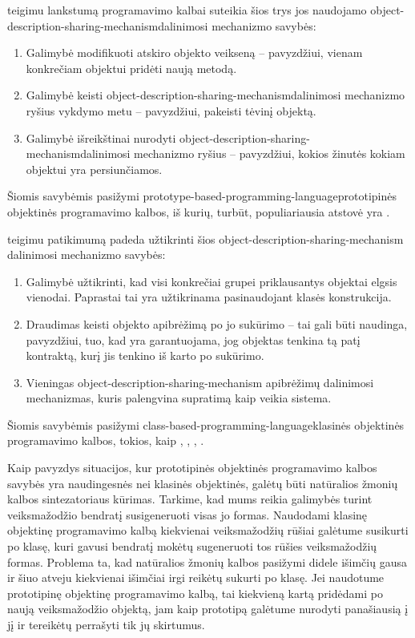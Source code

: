 \cite{Lieberman:1987:TO:62139.62144} teigimu lankstumą programavimo
kalbai suteikia šios trys jos naudojamo
\gls{object-description-sharing-mechanism}{dalinimosi mechanizmo}
savybės:
\begin{enumerate}
  \item Galimybė modifikuoti atskiro objekto veikseną – pavyzdžiui,
    vienam konkrečiam objektui pridėti naują metodą.
  \item Galimybė keisti
    \gls{object-description-sharing-mechanism}{dalinimosi
    mechanizmo} ryšius vykdymo metu – pavyzdžiui, pakeisti tėvinį
    objektą.
  \item Galimybė išreikštinai nurodyti
    \gls{object-description-sharing-mechanism}{dalinimosi mechanizmo}
    ryšius – pavyzdžiui, kokios žinutės kokiam objektui yra
    persiunčiamos.
\end{enumerate}
Šiomis savybėmis pasižymi
\gls{prototype-based-programming-language}{prototipinės objektinės
programavimo kalbos}, iš kurių, turbūt, populiariausia atstovė yra
.

\cite{Lieberman:1987:TO:62139.62144} teigimu patikimumą padeda
užtikrinti šios \gls{object-description-sharing-mechanism}{
dalinimosi mechanizmo} savybės:
\begin{enumerate}
  \item Galimybė užtikrinti, kad visi konkrečiai grupei priklausantys
    objektai elgsis vienodai. Paprastai tai yra užtikrinama
    pasinaudojant klasės konstrukcija.
  \item Draudimas keisti objekto apibrėžimą po jo sukūrimo – tai
    gali būti naudinga, pavyzdžiui, tuo, kad yra garantuojama,
    jog objektas tenkina tą patį kontraktą, kurį jis tenkino iš
    karto po sukūrimo.
  \item Vieningas \gls{object-description-sharing-mechanism}{
    apibrėžimų dalinimosi mechanizmas}, kuris palengvina supratimą
    kaip veikia sistema.
\end{enumerate}
Šiomis savybėmis pasižymi
\gls{class-based-programming-language}{klasinės objektinės
programavimo kalbos}, tokios, kaip , ,
, .

Kaip pavyzdys situacijos, kur prototipinės objektinės programavimo
kalbos savybės yra naudingesnės nei klasinės objektinės, galėtų
būti natūralios žmonių kalbos sintezatoriaus kūrimas. Tarkime, kad
mums reikia galimybės turint veiksmažodžio bendratį susigeneruoti
visas jo formas. Naudodami klasinę objektinę programavimo kalbą
kiekvienai veiksmažodžių rūšiai galėtume susikurti po klasę,
kuri gavusi bendratį mokėtų sugeneruoti tos rūšies veiksmažodžių
formas. Problema ta, kad natūralios žmonių kalbos pasižymi didele
išimčių gausa ir šiuo atveju kiekvienai išimčiai irgi reikėtų
sukurti po klasę. Jei naudotume prototipinę objektinę programavimo
kalbą, tai kiekvieną kartą pridėdami po naują veiksmažodžio
objektą, jam kaip prototipą galėtume nurodyti panašiausią į jį ir
tereikėtų perrašyti tik jų skirtumus.

